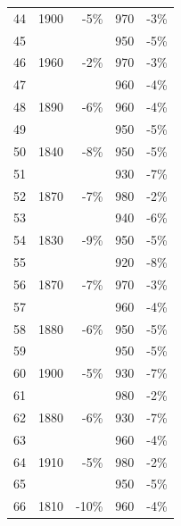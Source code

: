 \documentclass{scrartcl}
\begin{document}
\begin{longtable}{|r|l|r|r|r|}
    44    & 1900  & -5\%  & 970   & -3\% \\
    45    &       &       & 950   & -5\% \\
    46    & 1960  & -2\%  & 970   & -3\% \\
    47    &       &       & 960   & -4\% \\
    48    & 1890  & -6\%  & 960   & -4\% \\
    49    &       &       & 950   & -5\% \\
    50    & 1840  & \cellcolor[rgb]{ 1,  .922,  .612}\textcolor[rgb]{ .612,  .341,  0}{-8\%} & 950   & -5\% \\
    51    &       &       & 930   & \cellcolor[rgb]{ 1,  .922,  .612}\textcolor[rgb]{ .612,  .341,  0}{-7\%} \\
    52    & 1870  & \cellcolor[rgb]{ 1,  .922,  .612}\textcolor[rgb]{ .612,  .341,  0}{-7\%} & 980   & -2\% \\
    53    &       &       & 940   & \cellcolor[rgb]{ 1,  .922,  .612}\textcolor[rgb]{ .612,  .341,  0}{-6\%} \\
    54    & 1830  & \cellcolor[rgb]{ 1,  .922,  .612}\textcolor[rgb]{ .612,  .341,  0}{-9\%} & 950   & -5\% \\
    55    &       &       & 920   & \cellcolor[rgb]{ 1,  .922,  .612}\textcolor[rgb]{ .612,  .341,  0}{-8\%} \\
    56    & 1870  & \cellcolor[rgb]{ 1,  .922,  .612}\textcolor[rgb]{ .612,  .341,  0}{-7\%} & 970   & -3\% \\
    57    &       &       & 960   & -4\% \\
    58    & 1880  & \cellcolor[rgb]{ 1,  .922,  .612}\textcolor[rgb]{ .612,  .341,  0}{-6\%} & 950   & -5\% \\
    59    &       &       & 950   & -5\% \\
    60    & 1900  & -5\%  & 930   & \cellcolor[rgb]{ 1,  .922,  .612}\textcolor[rgb]{ .612,  .341,  0}{-7\%} \\
    61    &       &       & 980   & -2\% \\
    62    & 1880  & \cellcolor[rgb]{ 1,  .922,  .612}\textcolor[rgb]{ .612,  .341,  0}{-6\%} & 930   & \cellcolor[rgb]{ 1,  .922,  .612}\textcolor[rgb]{ .612,  .341,  0}{-7\%} \\
    63    &       &       & 960   & -4\% \\
    64    & 1910  & -5\%  & 980   & -2\% \\
    65    &       &       & 950   & -5\% \\
    66    & 1810  & \cellcolor[rgb]{ 1,  .922,  .612}\textcolor[rgb]{ .612,  .341,  0}{-10\%} & 960   & -4\% \\

\end{longtable}
\end{document}

